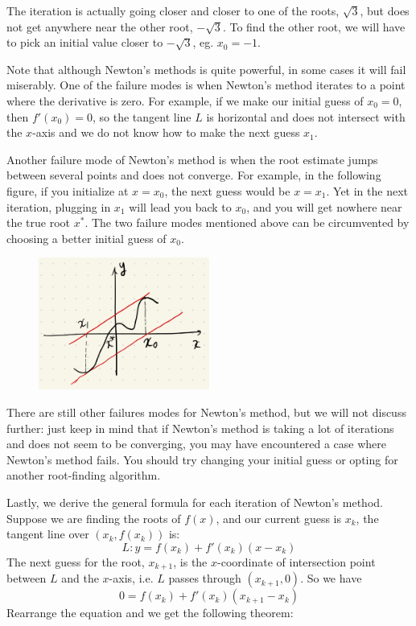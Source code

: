 \begin{remark}
    The iteration is actually going closer and closer to one of the roots, $\sqrt{3}$, but does not get anywhere near the other root, $-\sqrt{3}$.  To find the other root, we will have to pick an initial value closer to $-\sqrt{3}$, eg. $x_0 = -1$.
\end{remark}

Note that although Newton's methods is quite powerful, in some cases it will fail miserably.  One of the failure modes is when Newton's method iterates to a point where the derivative is zero.  For example, if we make our initial guess of $x_0 = 0$, then $f'(x_0) = 0$, so the tangent line $L$ is horizontal and does not intersect with the $x$-axis and we do not know how to make the next guess $x_1$. 

Another failure mode of Newton's method is when the root estimate jumps between several points and does not converge.  For example, in the following figure, if you initialize at $x = x_0$, the next guess would be $x = x_1$.  Yet in the next iteration, plugging in $x_1$ will lead you back to $x_0$, and you will get nowhere near the true root $x^*$.  The two failure modes mentioned above can be circumvented by choosing a better initial guess of $x_0$.  

\begin{figure}[ht]
    \centering
    \includegraphics[width = 0.5\textwidth]{figures/chap 05/newton_3.png}
    \label{fig: newton_3}
\end{figure}

There are still other failures modes for Newton's method, but we will not discuss further: just keep in mind that if Newton's method is taking a lot of iterations and does not seem to be converging, you may have encountered a case where Newton's method fails.  You should try changing your initial guess or opting for another root-finding algorithm.

Lastly, we derive the general formula for each iteration of Newton's method.  Suppose we are finding the roots of $f(x)$, and our current guess is $x_k$, the tangent line over $(x_k, f(x_k))$ is:
\[L: y = f(x_k) + f'(x_k)(x-x_k)\]
The next guess for the root, $x_{k+1}$, is the $x$-coordinate of intersection point between $L$ and the $x$-axis, i.e. $L$ passes through $(x_{k+1}, 0)$.  So we have
\[0 = f(x_k) + f'(x_k)(x_{k+1}-x_k)\]
Rearrange the equation and we get the following theorem:

